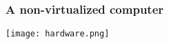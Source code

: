 \begin{frame}
\frametitle{A non-virtualized computer}
    \center\texttt{[image: hardware.png]}
\end{frame}
